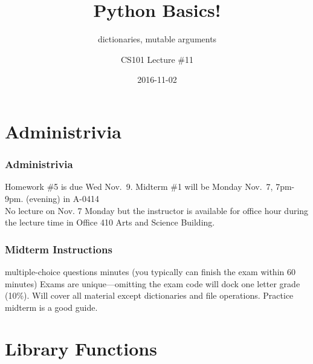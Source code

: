 \documentclass[11pt]{beamer}
\title{Python Basics!}
\subtitle{dictionaries, mutable arguments}
\author{CS101 Lecture \#11}
\date{2016-11-02}
\begin{document}
  \setcounter{showProgressBar}{0}
  \setcounter{showSlideNumbers}{0}

\frame{\titlepage}

\setcounter{framenumber}{0}
\setcounter{showProgressBar}{1}
\setcounter{showSlideNumbers}{1}

\section{Administrivia}

\begin{frame}
  \frametitle{Administrivia}
  \Enlarge

  \begin{itemize}
  \myitem  Homework \#5 is due Wed Nov.\ 9.
  \myitem  Midterm \#1 will be Monday Nov.\ 7, 7pm-9pm.  (evening) in A-0414\\ \textcolor{CS101GradBot}{No lecture on Nov. 7 Monday but the instructor is available for office hour during the lecture time in Office 410 Arts and Science Building.}
  \end{itemize}
\end{frame}

\begin{frame}
  \frametitle{Midterm Instructions}
  \Enlarge

  \begin{itemize}
   multiple-choice questions
   minutes (you typically can finish the exam within 60 minutes)
  \mysubitem  Exams are unique—omitting the exam code will dock one letter grade (10\%).
  \myitem  Will cover all material except dictionaries and file operations.  Practice midterm is a good guide.
  \end{itemize}
\end{frame}


\section{Library Functions}
\end{document}
